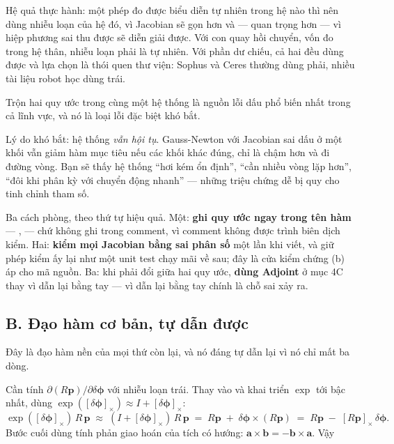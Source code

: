 \documentclass[../../vslam.tex]{subfiles}
\begin{document}
Hệ quả thực hành: một phép đo được biểu diễn tự nhiên trong hệ nào thì nên dùng nhiễu loạn của hệ đó, vì Jacobian sẽ gọn hơn và --- quan trọng hơn --- vì hiệp phương sai thu được sẽ diễn giải được. Với con quay hồi chuyển, vốn đo trong hệ thân, nhiễu loạn phải là tự nhiên. Với phần dư chiếu, cả hai đều dùng được và lựa chọn là thói quen thư viện: Sophus và Ceres thường dùng phải, nhiều tài liệu robot học dùng trái.

\begin{cambay}
Trộn hai quy ước trong cùng một hệ thống là nguồn lỗi dấu phổ biến nhất trong cả lĩnh vực, và nó là loại lỗi đặc biệt khó bắt.

Lý do khó bắt: hệ thống \emph{vẫn hội tụ}. Gauss-Newton với Jacobian sai dấu ở một khối vẫn giảm hàm mục tiêu nếu các khối khác đúng, chỉ là chậm hơn và đi đường vòng. Bạn sẽ thấy hệ thống ``hơi kém ổn định'', ``cần nhiều vòng lặp hơn'', ``đôi khi phân kỳ với chuyển động nhanh'' --- những triệu chứng dễ bị quy cho tinh chỉnh tham số.

Ba cách phòng, theo thứ tự hiệu quả. Một: \textbf{ghi quy ước ngay trong tên hàm} --- ,  --- chứ không ghi trong comment, vì comment không được trình biên dịch kiểm. Hai: \textbf{kiểm mọi Jacobian bằng sai phân số} một lần khi viết, và giữ phép kiểm ấy lại như một unit test chạy mãi về sau; đây là cửa kiểm chứng (b) áp cho mã nguồn. Ba: khi phải đổi giữa hai quy ước, \textbf{dùng Adjoint} ở mục 4C thay vì dẫn lại bằng tay --- vì dẫn lại bằng tay chính là chỗ sai xảy ra.
\end{cambay}

\subsection{B. Đạo hàm cơ bản, tự dẫn được}

Đây là đạo hàm nền của mọi thứ còn lại, và nó đáng tự dẫn lại vì nó chỉ mất ba dòng.

Cần tính \(\partial (R\mathbf{p}) / \partial \delta\boldsymbol{\phi}\) với nhiễu loạn trái. Thay vào và khai triển \(\exp\) tới bậc nhất, dùng \(\exp([\delta\boldsymbol{\phi}]_\times) \approx I + [\delta\boldsymbol{\phi}]_\times\):
\[
\exp([\delta\boldsymbol{\phi}]_\times)\,R\,\mathbf{p}
\;\approx\; (I + [\delta\boldsymbol{\phi}]_\times)\,R\,\mathbf{p}
\;=\; R\mathbf{p} \;+\; \delta\boldsymbol{\phi} \times (R\mathbf{p})
\;=\; R\mathbf{p} \;-\; [R\mathbf{p}]_\times\,\delta\boldsymbol{\phi}.
\]
Bước cuối dùng tính phản giao hoán của tích có hướng: \(\mathbf{a}\times\mathbf{b} = -\mathbf{b}\times\mathbf{a}\). Vậy
\end{document}
